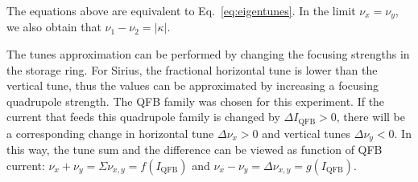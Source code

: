The equations above are equivalent to Eq.~\eqref{eq:eigentunes}. In the limit $\nu_x = \nu_y$, we also obtain that $\nu_1 - \nu_2 = |\kappa|$.

The tunes approximation can be performed by changing the focusing strengths in the storage ring. For Sirius, the fractional horizontal tune is lower than the vertical tune, thus the values can be approximated by increasing a focusing quadrupole strength. The QFB family was chosen for this experiment. If the current that feeds this quadrupole family is changed by $\Delta I_{\mathrm{QFB}}>0$, there will be a corresponding change in horizontal tune $\Delta\nu_x > 0$ and vertical tunes $\Delta\nu_y < 0$. In this way, the tune sum and the difference can be viewed as function of QFB current: $\nu_x + \nu_y = \Sigma \nu_{x, y} = f\left(I_{\mathrm{QFB}}\right)$ and $\nu_x - \nu_y = \Delta \nu_{x, y} = g\left(I_{\mathrm{QFB}}\right)$.

